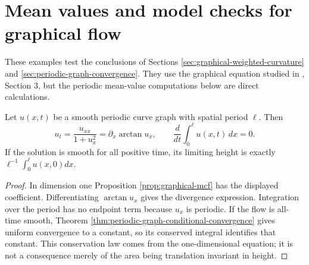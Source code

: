 \chapter{Mean values and model checks for graphical flow}\label{sec:examples-periodic-graph-flow}
These examples test the conclusions of Sections \ref{sec:graphical-weighted-curvature} and \ref{sec:periodic-graph-convergence}. They use the graphical equation studied in \cite{EH89}, Section 3, but the periodic mean-value computations below are direct calculations.

\begin{example}\label{ex:curve-graph-mean-conservation}
Let $u(x,t)$ be a smooth periodic curve graph with spatial period $\ell$. Then
\[
 u_t=\frac{u_{xx}}{1+u_x^2}=\partial_x\arctan u_x,
 \qquad \frac d{dt}\int_0^\ell u(x,t)\,dx=0.
\]
If the solution is smooth for all positive time, its limiting height is exactly $\ell^{-1}\int_0^\ell u(x,0)dx$.
\end{example}
\begin{proof}
In dimension one Proposition \ref{prop:graphical-mcf} has the displayed coefficient. Differentiating $\arctan u_x$ gives the divergence expression. Integration over the period has no endpoint term because $u_x$ is periodic. If the flow is all-time smooth, Theorem \ref{thm:periodic-graph-conditional-convergence} gives uniform convergence to a constant, so its conserved integral identifies that constant. This conservation law comes from the one-dimensional equation; it is not a consequence merely of the area being translation invariant in height.
\end{proof}

